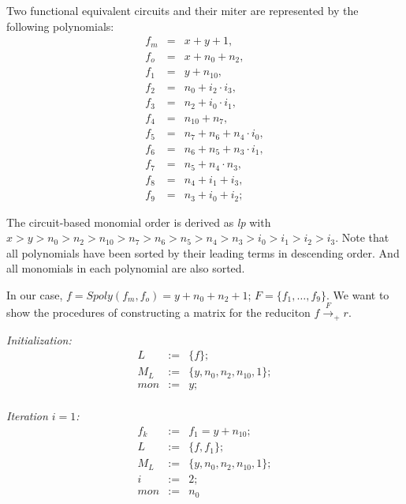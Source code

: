 \begin{Example}\label{exp:consmatix}
	Two functional equivalent circuits and their miter are 
	represented by the following polynomials:
	\begin{eqnarray}
		f_m&=&x+y+1, \nonumber \\
		f_o&=&x+n_0+n_2, \nonumber \\
		f_1&=&y+n_{10}, \nonumber \\
		f_2&=&n_0+i_2\cdot i_3, \nonumber \\
		f_3&=&n_2+i_0\cdot i_1, \nonumber \\
		f_4&=&n_{10}+n_7, \nonumber \\
		f_{5}&=&n_7+n_6+n_4\cdot i_0, \nonumber \\
		f_{6}&=&n_6+n_5+n_3\cdot i_1, \nonumber \\
		f_{7}&=&n_5+n_4\cdot n_3,  \nonumber \\
		f_{8}&=&n_4+i_1+i_3, \nonumber \\
		f_{9}&=&n_3+i_0+i_2;\nonumber 
	\end{eqnarray}
	
	The circuit-based monomial order is derived as {\it lp} with  
	$x>y>n_0>n_2>n_{10}>n_7>n_6>n_5>n_4>n_3>i_0>i_1>i_2>i_3$.
	Note that all polynomials have been sorted by their leading terms in descending order.
	And all monomials in each polynomial are also sorted.
	
	In our case, $f=Spoly(f_{m},f_{o})=y+n_0+n_2+1$; $F=\{f_{1},\dots, f_{9}\}$. 
	We want to show the procedures of constructing a matrix for the reduciton $f \xrightarrow{F}_{+}r$.
	
		
	{\it Initialization:}
	\begin{eqnarray}
		L&:=&\{f\}; \nonumber \\
		M_{L}&:=&\{ y,n_0,n_2,n_{10},1\}; \nonumber \\
		mon&:=& y ;\nonumber
	\end{eqnarray}\\
	
	{\it Iteration $i=1$:}	
	\begin{eqnarray}
		f_{k}&:=&f_{1}=y+n_{10}; \nonumber \\
		L&:=&\{f,f_1\}; \nonumber \\
		M_{L}&:=&\{ y,n_0,n_2,n_{10},1\}; \nonumber \\
		i&:=&2;  \nonumber \\
		mon&:=& n_0\nonumber 
	\end{eqnarray}\\
	

\end{Example}
